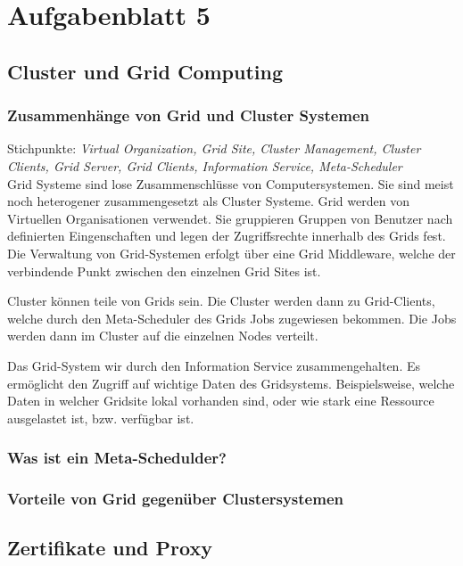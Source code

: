 \section{Aufgabenblatt 5}
\subsection{Cluster und Grid Computing}

	\subsubsection*{Zusammenhänge von Grid und Cluster Systemen}
	{\scriptsize Stichpunkte: \textsl{Virtual Organization, Grid Site, Cluster Management, Cluster Clients, Grid Server, Grid Clients, Information Service, Meta-Scheduler} } \\
	
		Grid Systeme sind lose Zusammenschlüsse von Computersystemen.
		Sie sind meist noch heterogener zusammengesetzt als Cluster Systeme.
		Grid werden von Virtuellen Organisationen verwendet.
		Sie gruppieren Gruppen von Benutzer nach definierten Eingenschaften
		und legen der Zugriffsrechte innerhalb des Grids fest.
		Die Verwaltung von Grid-Systemen erfolgt über eine Grid Middleware,
		welche der verbindende Punkt zwischen den einzelnen Grid Sites ist.
		
		Cluster können teile von Grids sein.
		Die Cluster werden dann zu Grid-Clients,
		welche durch den Meta-Scheduler des Grids Jobs zugewiesen bekommen.
		Die Jobs werden dann im Cluster auf die einzelnen Nodes verteilt.
		
		Das Grid-System wir durch den Information Service zusammengehalten.
		Es ermöglicht den Zugriff auf wichtige Daten des Gridsystems.
		Beispielsweise, welche Daten in welcher Gridsite lokal vorhanden sind,
		oder wie stark eine Ressource ausgelastet ist, bzw. verfügbar ist.

	\subsubsection*{Was ist ein Meta-Schedulder?}
	\subsubsection*{Vorteile von Grid gegenüber Clustersystemen}

\subsection{Zertifikate und Proxy}
